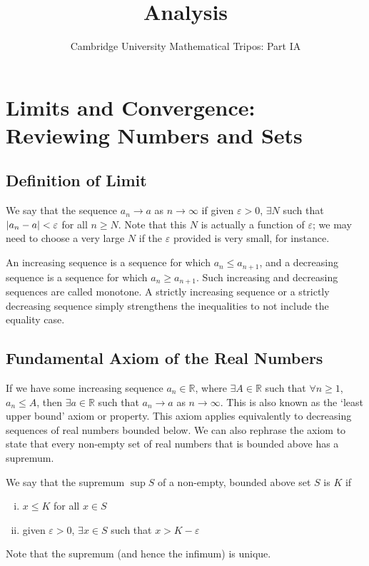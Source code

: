 \documentclass{article}
\title{Analysis}
\author{Cambridge University Mathematical Tripos: Part IA}
\begin{document}
\maketitle

\tableofcontents
\newpage

\section{Limits and Convergence: Reviewing Numbers and Sets}
\subsection{Definition of Limit}
\begin{definition}
	We say that the sequence $a_n \to a$ as $n \to \infty$ if given $\varepsilon > 0$, $\exists N$ such that $\abs{a_n - a} < \varepsilon$ for all $n \geq N$. Note that this $N$ is actually a function of $\varepsilon$; we may need to choose a very large $N$ if the $\varepsilon$ provided is very small, for instance.
\end{definition}
\begin{definition}
	An increasing sequence is a sequence for which $a_n \leq a_{n+1}$, and a decreasing sequence is a sequence for which $a_n \geq a_{n+1}$. Such increasing and decreasing sequences are called monotone.
	A strictly increasing sequence or a strictly decreasing sequence simply strengthens the inequalities to not include the equality case.
\end{definition}

\subsection{Fundamental Axiom of the Real Numbers}
If we have some increasing sequence $a_n \in \mathbb R$, where $\exists A \in \mathbb R$ such that $\forall n \geq 1$, $a_n \leq A$, then $\exists a \in \mathbb R$ such that $a_n \to a$ as $n \to \infty$. This is also known as the `least upper bound' axiom or property. This axiom applies equivalently to decreasing sequences of real numbers bounded below. We can also rephrase the axiom to state that every non-empty set of real numbers that is bounded above has a supremum.
\begin{definition}
	We say that the supremum $\sup S$ of a non-empty, bounded above set $S$ is $K$ if
	\begin{enumerate}[(i)]
		\item $x \leq K$ for all $x \in S$
		\item given $\varepsilon > 0$, $\exists x \in S$ such that $x > K - \varepsilon$
	\end{enumerate}
\end{definition}
Note that the supremum (and hence the infimum) is unique.
\end{document}
